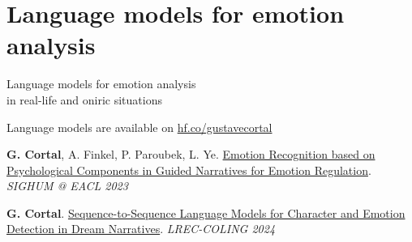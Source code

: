\documentclass[handout,10pt]{beamer}
\begin{document}
\section{Language models for emotion analysis}

\begin{frame}{}
\Large
\vfill
\begin{center}
    Language models for emotion analysis\\ in real-life and oniric situations
\end{center}

\vfill

\footnotesize




Language models are available on \href{https://huggingface.co/gustavecortal}{hf.co/gustavecortal}

\vspace{0.5cm}

\textbf{G. Cortal}, A. Finkel, P. Paroubek, L. Ye. \href{https://aclanthology.org/2023.latechclfl-1.8/}{Emotion Recognition based on Psychological Components in Guided Narratives for Emotion Regulation}. \textit{SIGHUM @ EACL 2023}

\vspace{0.5cm}

\textbf{G. Cortal}. \href{https://aclanthology.org/2024.lrec-main.1282/}{Sequence-to-Sequence Language Models for Character and Emotion Detection in Dream Narratives}. \textit{LREC-COLING 2024}

\end{frame}
\end{document}
